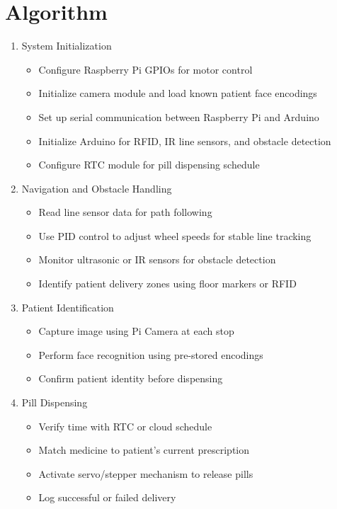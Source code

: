 \section{Algorithm}
\begin{enumerate}
    \item System Initialization
    \begin{itemize}
        \item Configure Raspberry Pi GPIOs for motor control
        \item Initialize camera module and load known patient face encodings
        \item Set up serial communication between Raspberry Pi and Arduino
        \item Initialize Arduino for RFID, IR line sensors, and obstacle detection
        \item Configure RTC module for pill dispensing schedule
    \end{itemize}

    \item Navigation and Obstacle Handling
    \begin{itemize}
        \item Read line sensor data for path following
        \item Use PID control to adjust wheel speeds for stable line tracking
        \item Monitor ultrasonic or IR sensors for obstacle detection
        \item Identify patient delivery zones using floor markers or RFID
    \end{itemize}

    \item Patient Identification
    \begin{itemize}
        \item Capture image using Pi Camera at each stop
        \item Perform face recognition using pre-stored encodings
        \item Confirm patient identity before dispensing
    \end{itemize}

    \item Pill Dispensing
    \begin{itemize}
        \item Verify time with RTC or cloud schedule
        \item Match medicine to patient's current prescription
        \item Activate servo/stepper mechanism to release pills
        \item Log successful or failed delivery
    \end{itemize}


\end{enumerate}
